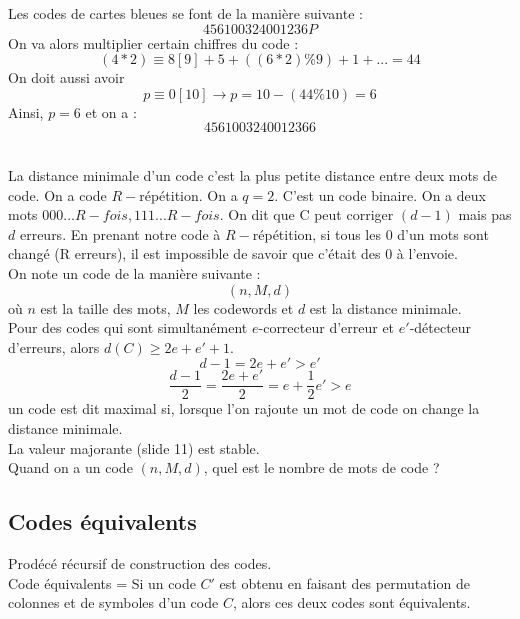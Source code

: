 Les codes de cartes bleues se font de la manière suivante :
\begin{equation}
 4561 0032 4001 236P
\end{equation}
On va alors multiplier certain chiffres du code :
\begin{equation}
 (4*2)\equiv8[9]+5+((6*2)\%9)+1+...=44
\end{equation}
On doit aussi avoir 
\begin{equation}
 p\equiv0[10] \rightarrow p = 10 -(44\%10)=6
\end{equation}
Ainsi, $p = 6$ et on a :
\begin{equation}
 4561 0032 4001 2366
\end{equation}
~\\\par
La distance minimale d'un code c'est la plus petite distance entre deux mots de code.
On a code $R-$répétition. On a $q=2$. C'est un code binaire. On a deux mots ${000...R-fois, 111...R-fois}$.
On dit que C peut corriger $(d-1)$ mais pas $d$ erreurs.
En prenant notre code à $R-$répétition, si tous les $0$ d'un mots sont changé (R erreurs), il est impossible de savoir que c'était des 0 à l'envoie.\\
On note un code de la manière suivante :
\begin{equation}
 (n, M, d)
\end{equation}
où $n$ est la taille des mots, $M$ les codewords et $d$ est la distance minimale.\\
Pour des codes qui sont simultanément $e$-correcteur d'erreur et $e'$-détecteur d'erreurs, alors $d(C)\geq2e+e'+1$.
\begin{equation}
 d-1=2e+e' > e'
\end{equation}
\begin{equation}
 \frac{d-1}{2}=\frac{2e+e'}{2}=e+\frac{1}{2}e'>e
\end{equation}
un code est dit maximal si, lorsque l'on rajoute un mot de code on change la distance minimale.\\
La valeur majorante (slide 11) est stable.\\
Quand on a un code $(n, M, d)$, quel est le nombre de mots de code ? \\
\subsection{Codes équivalents}
Prodécé récursif de construction des codes.\\
Code équivalents = Si un code $C'$ est obtenu en faisant des permutation de colonnes et de symboles d'un code $C$, alors ces deux codes sont équivalents.
